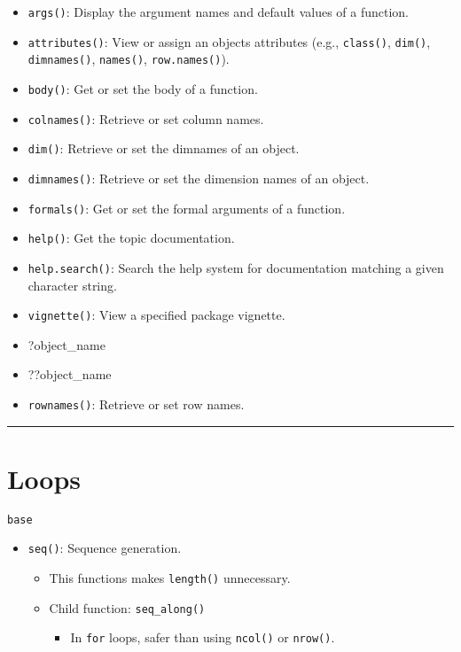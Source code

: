 \documentclass[
]{book}
\providecommand{\tightlist}{%
  \setlength{\itemsep}{0pt}\setlength{\parskip}{0pt}}
\begin{document}
\begin{itemize}
\tightlist
\item
  \texttt{args()}: Display the argument names and default values of a function.
\item
  \texttt{attributes()}: View or assign an objects attributes (e.g., \texttt{class()}, \texttt{dim()}, \texttt{dimnames()}, \texttt{names()}, \texttt{row.names()}).
\item
  \texttt{body()}: Get or set the body of a function.
\item
  \texttt{colnames()}: Retrieve or set column names.
\item
  \texttt{dim()}: Retrieve or set the dimnames of an object.
\item
  \texttt{dimnames()}: Retrieve or set the dimension names of an object.
\item
  \texttt{formals()}: Get or set the formal arguments of a function.
\item
  \texttt{help()}: Get the topic documentation.
\item
  \texttt{help.search()}: Search the help system for documentation matching a given character string.
\item
  \texttt{vignette()}: View a specified package vignette.
\item
  ?object\_name
\item
  ??object\_name
\item
  \texttt{rownames()}: Retrieve or set row names.
\end{itemize}

\begin{center}\rule{0.5\linewidth}{0.5pt}\end{center}

\hypertarget{loops}{%
\section{Loops}\label{loops}}

\texttt{base}

\begin{itemize}
\tightlist
\item
  \texttt{seq()}: Sequence generation.

  \begin{itemize}
  \tightlist
  \item
    This functions makes \texttt{length()} unnecessary.
  \item
    Child function: \texttt{seq\_along()}

    \begin{itemize}
    \tightlist
    \item
      In \texttt{for} loops, safer than using \texttt{ncol()} or \texttt{nrow()}.
    \end{itemize}
  \end{itemize}
\end{itemize}
\end{document}
